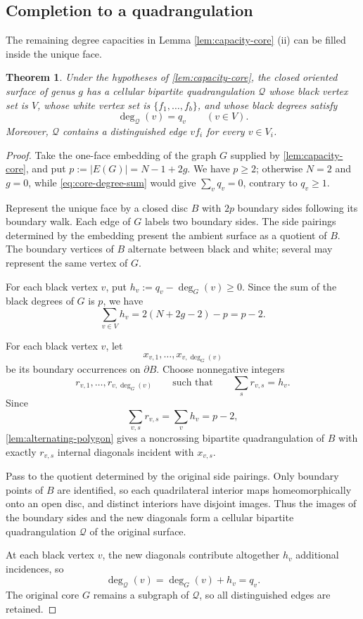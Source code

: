 \documentclass[11pt]{amsart}
\theoremstyle{definition}
\theoremstyle{plain}
\newtheorem{theorem}{Theorem}[section]
\theoremstyle{definition}
\theoremstyle{definition}
\newcommand{\cQ}{\mathcal Q}
\begin{document}
\subsection{Completion to a quadrangulation}

The remaining degree capacities in Lemma \ref{lem:capacity-core} (ii) can be filled inside the unique face.

\begin{theorem}
\label{thm:prescribed-quadrangulation}
Under the hypotheses of \cref{lem:capacity-core}, the closed oriented
surface of genus $g$ has a cellular bipartite quadrangulation $\cQ$ whose
black vertex set is $V$, whose white vertex set is
$\{f_1,\ldots,f_b\}$, and whose black degrees satisfy
\begin{equation}
\label{eq:quadrangulation-degrees}
 \deg_{\cQ}(v)=q_v\qquad(v\in V).
\end{equation}
Moreover, $\cQ$ contains a distinguished edge $vf_i$ for every $v\in V_i$.
\end{theorem}

\begin{proof}
Take the one-face embedding of the graph $G$ supplied by
\cref{lem:capacity-core}, and put $p:=|E(G)|=N-1+2g$.
We have $p\geq2$; otherwise $N=2$ and $g=0$, while
\eqref{eq:core-degree-sum} would give $\sum_vq_v=0$,
contrary to $q_v\geq1$.

Represent the unique face by a closed disc $B$ with $2p$
boundary sides following its boundary walk. Each edge of
$G$ labels two boundary sides. The side pairings determined
by the embedding present the ambient surface as a quotient
of $B$. The boundary vertices of $B$ alternate between black
and white; several may represent the same vertex of $G$.

For each black vertex $v$, put
$h_v:=q_v-\deg_G(v)\geq0$. Since the sum of the black
degrees of $G$ is $p$, we have
\begin{equation}
\label{eq:residual-demand}
  \sum_{v\in V}h_v=2(N+2g-2)-p=p-2.
\end{equation}

For each black vertex $v$, let
\[
  x_{v,1},\ldots,x_{v,\deg_G(v)}
\]
be its boundary occurrences on $\partial B$. Choose
nonnegative integers
\[
  r_{v,1},\ldots,r_{v,\deg_G(v)}
  \qquad\text{such that}\qquad
  \sum_s r_{v,s}=h_v.
\]
Since
\[
  \sum_{v,s}r_{v,s}=\sum_vh_v=p-2,
\]
\cref{lem:alternating-polygon} gives a noncrossing bipartite
quadrangulation of $B$ with exactly $r_{v,s}$ internal
diagonals incident with $x_{v,s}$.

Pass to the quotient determined by the original side
pairings. Only boundary points of $B$ are identified,
so each quadrilateral interior maps homeomorphically
onto an open disc, and distinct interiors have disjoint
images. Thus the images of the boundary sides and the
new diagonals form a cellular bipartite quadrangulation
$\cQ$ of the original surface.

At each black vertex $v$, the new diagonals contribute
altogether $h_v$ additional incidences, so
\[
  \deg_{\cQ}(v)=\deg_G(v)+h_v=q_v.
\]
The original core $G$ remains a subgraph of $\cQ$, so all
distinguished edges are retained.
\end{proof}
\end{document}
